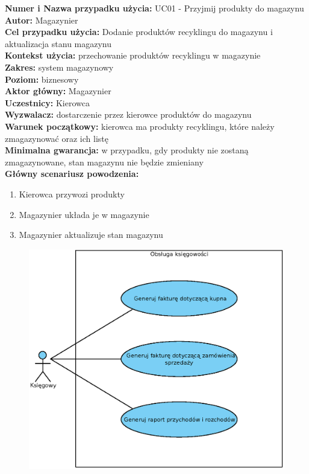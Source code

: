 \textbf{Numer i Nazwa przypadku użycia:} UC01 - Przyjmij produkty do magazynu \\
\textbf{Autor:} Magazynier\\
\textbf{Cel przypadku użycia:} Dodanie produktów recyklingu do magazynu i aktualizacja stanu magazynu \\
\textbf{Kontekst użycia:} przechowanie produktów recyklingu w magazynie\\
\textbf{Zakres:} system magazynowy \\
\textbf{Poziom:} biznesowy \\
\textbf{Aktor główny:} Magazynier \\
\textbf{Uczestnicy:} Kierowca \\
\textbf{Wyzwalacz:} dostarczenie przez kierowce produktów do magazynu \\
\textbf{Warunek początkowy:} kierowca ma produkty recyklingu, które należy zmagazynować oraz ich listę \\
\textbf{Minimalna gwarancja:} w przypadku, gdy produkty nie zostaną zmagazynowane, stan magazynu nie będzie zmieniany \\
\textbf{Główny scenariusz powodzenia:} \\
	\begin{enumerate}
		\item Kierowca przywozi produkty
		\item Magazynier układa je w magazynie
		\item Magazynier aktualizuje stan magazynu
	\end{enumerate}
\begin{figure}[H]
	\centering
	\includegraphics[width=.8\textwidth]{img/UC/ksiegowosc.eps}
\end{figure}

